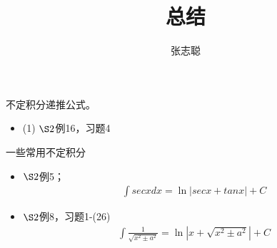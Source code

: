 \documentclass{article}
\begin{document}
\title{总结}
\author{张志聪}
\maketitle

\begin{zremark}
  不定积分递推公式。
\end{zremark}
\begin{itemize}
  \item (1) $\S 2$例16，习题4
\end{itemize}

\begin{zremark}
  一些常用不定积分
\end{zremark}

\begin{itemize}
  \item $\S 2$例5；
        \begin{align*}
          \int sec x dx = \ln |sec x + tan x| + C
        \end{align*}

  \item $\S 2$例8，习题1-(26)
        \begin{align*}
          \int \frac{1}{\sqrt{x^2 \pm a^2}} = \ln |x + \sqrt{x^2 \pm a^2}| + C
        \end{align*}
\end{itemize}
\end{document}
